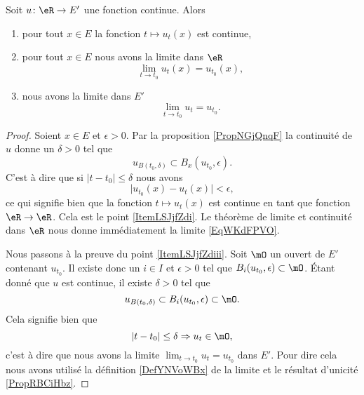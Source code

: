 \begin{proposition} \label{PropVKSNflB}
    Soit \( u\colon \eR\to E'\) une fonction continue. Alors
    \begin{enumerate}
        \item   \label{ItemLSJjfZdi}
            pour tout \( x\in E\) la fonction \( t\mapsto u_t(x)\) est continue,
        \item\label{ItemLSJjfZdii}
            pour tout \( x\in E\) nous avons la limite dans \( \eR\)
            \begin{equation}    \label{EqWKdFPVO}
                \lim_{t\to t_0} u_t(x)=u_{t_0}(x),
            \end{equation}
        \item\label{ItemLSJjfZdiii}
            nous avons la limite dans \( E'\) 
            \begin{equation}
                \lim_{t\to t_0} u_t=u_{t_0}.
            \end{equation}
    \end{enumerate}
\end{proposition}

\begin{proof}
    Soient \( x\in E\) et \( \epsilon> 0\). Par la proposition \ref{PropNGjQnqF} la continuité de \( u\) donne un \( \delta>0\) tel que
    \begin{equation}
        u_{B(t_0,\delta)}\subset B_x(u_{t_0},\epsilon).
    \end{equation}
    C'est à dire que si \( | t-t_0 |\leq \delta\) nous avons
    \begin{equation}
        \big| u_{t_0}(x)-u_t(x) \big|<\epsilon,
    \end{equation}
    ce qui signifie bien que la fonction \( t\mapsto u_t(x)\) est continue en tant que fonction \( \eR\to \eR\). Cela est le point \ref{ItemLSJjfZdi}. Le théorème de limite et continuité dans \( \eR\) nous donne immédiatement la limite \eqref{EqWKdFPVO}.

    Nous passons à la preuve du point \ref{ItemLSJjfZdiii}. Soit \( \mO\) un ouvert de \( E'\) contenant \( u_{t_0}\). Il existe donc un \( i\in I\) et \( \epsilon>0\) tel que \( B_i(u_{t_0},\epsilon)\subset \mO\). Étant donné que \( u\) est continue, il existe \( \delta>0\) tel que
    \begin{equation}
        u_{B(t_0,\delta)}\subset B_i(u_{t_0},\epsilon)\subset \mO.
    \end{equation}
    Cela signifie bien que 
    \begin{equation}
        | t-t_0 |\leq \delta\Rightarrow u_t\in\mO,
    \end{equation}
    c'est à dire que nous avons la limite \( \lim_{t\to t_0} u_t=u_{t_0}\) dans \( E'\). Pour dire cela nous avons utilisé la définition \ref{DefYNVoWBx} de la limite et le résultat d'unicité \ref{PropRBCiHbz}.
\end{proof}

